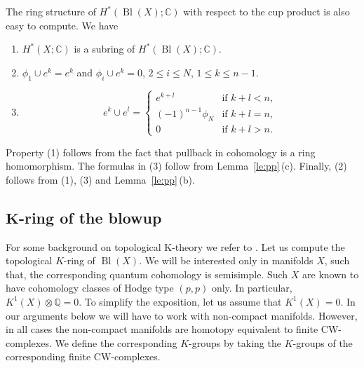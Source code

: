 \documentclass[pdftex]{sigma}
\numberwithin{equation}{section}
\newcommand{\CC}{\mathbb{C}}
\newcommand{\QQ}{\mathbb{Q}}
\begin{document}
The ring structure of $H^*(\operatorname{Bl}(X);\CC)$ with respect to
the cup product is also easy to compute. We have
\begin{enumerate}\itemsep=0pt
\item[(1)]
 $H^*(X;\CC)$ is a subring of $H^*(\operatorname{Bl}(X);\CC)$.
\item[(2)]
$\phi_1\cup e^k=e^k$ and
$\phi_i \cup e^k = 0$, $2\leq i\leq N$, $1\leq k\leq n-1$.
\item[(3)]
\[
e^k\cup e^l=\begin{cases}
e^{k+l} & \mbox{if } k+l<n,\\
(-1)^{n-1}\phi_N & \mbox{if } k+l=n,\\
0 & \mbox{if } k+l >n.
\end{cases}
\]
\end{enumerate}
Property (1) follows from the fact that pullback in cohomology is a
ring homomorphism. The formulas in (3) follow from
Lemma~\ref{le:pp}\,(c). Finally, (2) follows from (1), (3) and Lemma~\ref{le:pp}\,(b).

\subsection[K-ring of the blowup]{$\boldsymbol{K}$-ring of the blowup}
For some background on topological K-theory we refer to
\cite[Chapter~6]{FoFu2016}.
Let us compute the topological $K$-ring of $\operatorname{Bl}(X)$. We will be interested
only in manifolds $X$, such that, the corresponding quantum cohomology
is semisimple. Such $X$ are known to have cohomology classes of Hodge
type $(p,p)$ only. In particular, $K^{1}(X)\otimes \QQ=0$. To simplify the
exposition, let us assume that $K^1(X)=0$. In our arguments below we
will have to work with non-compact manifolds. However, in all cases
the non-compact manifolds are homotopy equivalent to finite
CW-complexes. We define the corresponding $K$-groups by taking the
$K$-groups of the corresponding finite CW-complexes.
\end{document}

